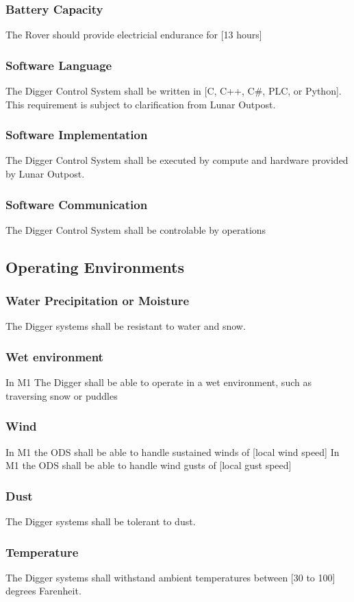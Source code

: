 \subsubsection{Battery Capacity}
The Rover should provide electricial endurance for [13 hours]
\subsubsection{Software Language}
The Digger Control System shall be written in [C, C++, C#, PLC, or Python]. This requirement is subject to clarification from Lunar Outpost.
\subsubsection{Software Implementation}
The Digger Control System shall be executed by compute and hardware provided by Lunar Outpost.
\subsubsection{Software Communication}
The Digger Control System shall be controlable by operations
\subsection{Operating Environments}
\subsubsection{Water Precipitation or Moisture}
The Digger systems shall be resistant to water and snow. 
\subsubsection{Wet environment}
In M1 The Digger shall be able to operate in a wet environment, such as traversing snow or puddles
\subsubsection{Wind}
In M1 the ODS shall be able to handle sustained winds of [local wind speed]
In M1 the ODS shall be able to handle wind gusts of [local gust speed]
\subsubsection{Dust}
The Digger systems shall be tolerant to dust. 
\subsubsection{Temperature}
The Digger systems shall withstand ambient temperatures between [30 to 100] degrees Farenheit.
